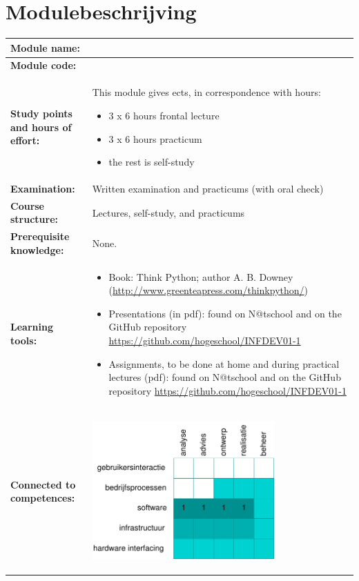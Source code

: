 \section*{Modulebeschrijving}
\begin{tabularx}{\textwidth}{|>{\columncolor{lichtGrijs}} p{}|X|}
	\hline
	\textbf{Module name:} & \modulenaam\\
	\hline
	\textbf{Module code: }& \modulecode\\
	\hline
	\textbf{Study points \newline and hours of effort:} & This module gives \stdPunten{}  ects, in correspondence with \FPeval{\result}{clip(\stdPunten*28)}\result{} hours:
	\begin{itemize}
		\item 3 x 6 hours frontal lecture
		\item 3 x 6 hours practicum
		\item the rest is self-study
	\end{itemize} \\
	\hline
	\textbf{Examination:} & Written examination and practicums (with oral check) \\
	\hline
	\textbf{Course structure:} & Lectures, self-study, and practicums \\
	\hline
	\textbf{Prerequisite knowledge:} & None. \\
	\hline
	\textbf{Learning tools:}  &
		\begin{itemize}
			\item Book: Think Python; author A. B. Downey (\url{http://www.greenteapress.com/thinkpython/})
			\item Presentations (in pdf): found on N@tschool and on the GitHub repository \url{https://github.com/hogeschool/INFDEV01-1}
			\item Assignments, to be done at home and during practical lectures (pdf): found on N@tschool and on the GitHub repository \url{https://github.com/hogeschool/INFDEV01-1}
		\end{itemize} \\
	\hline
	\textbf{Connected to \newline competences:} &
	\begin{center}
		\includegraphics[width=7cm]{../img/comptabel.pdf}

\end{center}
\end{tabularx}
